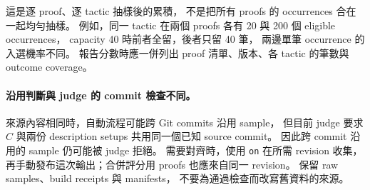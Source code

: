 這是逐 proof、逐 tactic 抽樣後的累積，\allowbreak
不是把所有 proofs 的 occurrences 合在一起均勻抽樣。
例如，同一 tactic 在兩個 proofs 各有 20 與 200 個 eligible occurrences，\allowbreak
capacity 40 時前者全留，\allowbreak 後者只留 40 筆，\allowbreak
兩邊單筆 occurrence 的入選機率不同。
報告分數時應一併列出 proof 清單、版本、各 tactic 的筆數與 outcome coverage。

\paragraph{沿用判斷與 judge 的 commit 檢查不同。}
來源內容相同時，\allowbreak 自動流程可能跨 Git commits 沿用 sample，\allowbreak
但目前 judge 要求 $C$ 與兩份 description setups 共用同一個已知 source commit。
因此跨 commit 沿用的 sample 仍可能被 judge 拒絕。
需要對齊時，\allowbreak 使用 \texttt{on} 在所需 revision 收集，\allowbreak
再手動發布這次輸出；\allowbreak 合併評分用 proofs 也應來自同一 revision。
保留 raw samples、build receipts 與 manifests，\allowbreak
不要為通過檢查而改寫舊資料的來源。
